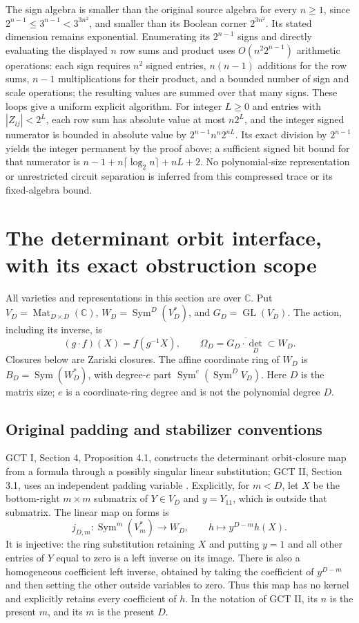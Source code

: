The sign algebra is smaller than the original source algebra for
every $n\ge1$, since $2^{n-1}\le3^{n-1}<3^{3n^2}$, and smaller
than its Boolean corner $2^{3n^2}$. Its stated dimension remains
exponential. Enumerating its $2^{n-1}$ signs and directly evaluating
the displayed $n$ row sums and product uses $O(n^2 2^{n-1})$
arithmetic operations: each sign requires $n^2$ signed entries,
$n(n-1)$ additions for the row sums, $n-1$ multiplications for
their product, and a bounded number of sign and scale operations;
the resulting values are summed over that many signs. These loops
give a uniform explicit algorithm. For integer $L\ge0$ and entries with
$|Z_{ij}|<2^L$, each row sum has absolute value at most $n2^L$,
and the integer signed numerator is bounded in absolute value by
$2^{n-1}n^n2^{nL}$. Its exact division by $2^{n-1}$ yields the
integer permanent by the proof above; a sufficient signed bit bound
for that numerator is
$n-1+n\lceil\log_2 n\rceil+nL+2$.
No polynomial-size representation or unrestricted circuit separation
is inferred from this compressed trace or its fixed-algebra bound.

\section{The determinant orbit interface, with its exact obstruction scope}
\label{sec:gct-obstruction-interface}

All varieties and representations in this section are over $\mathbb C$.
Put $V_D=\operatorname{Mat}_{D\times D}(\mathbb C)$,
$W_D=\operatorname{Sym}^D(V_D^*)$, and $G_D=\operatorname{GL}(V_D)$.
The action, including its inverse, is
\[
 (g\cdot f)(X)=f(g^{-1}X),\qquad
 \Omega_D=\overline{G_D\cdot\det_D}\subset W_D.
\]
Closures below are Zariski closures. The affine coordinate ring of $W_D$
is $B_D=\operatorname{Sym}(W_D^*)$, with degree-$e$ part
$\operatorname{Sym}^e(\operatorname{Sym}^D V_D)$.
Here $D$ is the matrix size; $e$ is a coordinate-ring degree and is
not the polynomial degree $D$.

\subsection{Original padding and stabilizer conventions}

GCT I, Section 4, Proposition 4.1, constructs the determinant orbit-closure
map from a formula through a possibly singular linear substitution;
GCT II, Section 3.1, uses an independent padding variable
\cite{MS2001Interface,MS2006Interface}. Explicitly, for $m<D$, let
$X$ be the bottom-right $m\times m$ submatrix of $Y\in V_D$ and
$y=Y_{11}$, which is outside that submatrix. The linear map on forms is
\[
 j_{D,m}:\operatorname{Sym}^m(V_m^*)\longrightarrow W_D,
 \qquad h\longmapsto y^{D-m}h(X).
\]
It is injective: the ring substitution retaining $X$ and putting $y=1$
and all other entries of $Y$ equal to zero is a left inverse on its
image. There is also a homogeneous coefficient left inverse, obtained
by taking the coefficient of $y^{D-m}$ and then setting the other
outside variables to zero. Thus this map has no kernel and explicitly
retains every coefficient of $h$. In the notation of GCT II, its $n$
is the present $m$, and its $m$ is the present $D$.

